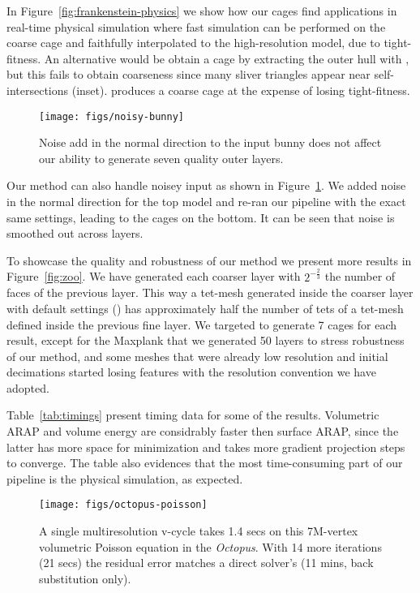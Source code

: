 In Figure~\ref{fig:frankenstein-physics} we show
how our cages find applications in real-time physical simulation where
fast simulation can be performed on the coarse cage and faithfully
interpolated to the high-resolution model, due to tight-fitness.
An alternative would be obtain a cage by extracting
the outer hull with \cite{Jacobson:WN:2013}, but this fails to obtain
coarseness since many sliver triangles appear near self-intersections (inset).
\cite{Xu:2014:SDF} produces a coarse cage at the expense
of losing tight-fitness.

\begin{figure}
  \texttt{[image: figs/noisy-bunny]}
  \caption{Noise add in the normal direction to the input bunny does not
  affect our ability to generate seven quality outer layers.}
  \label{fig:noisy-bunny}
\end{figure}

Our method can also handle noisey input as shown in Figure~\ref{fig:noisy-bunny}.
We added noise in the normal direction for the top model and 
re-ran our pipeline with the exact same settings, leading to the cages on the bottom.
It can be seen that noise is smoothed out across layers. 

To showcase the quality and robustness of our method we present more results 
in Figure~\ref{fig:zoo}. We have generated each coarser layer with $2^{-\frac{2}{3}}$
the number of faces of the previous layer. This way a tet-mesh generated inside
the coarser layer with default settings () has
approximately half the number of tets of a tet-mesh defined inside the previous
fine layer. We targeted to generate 7 cages for each result, except for the Maxplank
that we generated 50 layers to stress robustness of our method, and some meshes that
were already low resolution and initial decimations started losing features with
the resolution convention we have adopted.

Table~\ref{tab:timings} present timing data for some of the results.  Volumetric ARAP
and volume energy are considrably faster then surface ARAP, since the latter has more
space for minimization and takes more gradient projection steps to converge.
The table also evidences that the most time-consuming
part of our pipeline is the physical simulation, as expected.



\begin{figure}
  \texttt{[image: figs/octopus-poisson]}
  \caption{A single multiresolution v-cycle takes 1.4 secs on this 7M-vertex
  volumetric Poisson equation in the \emph{Octopus}. With 14 more iterations
  (21 secs) the residual error matches a direct solver's (11 mins, back
  substitution only).}
  \label{fig:octopus-poisson}
\end{figure}


